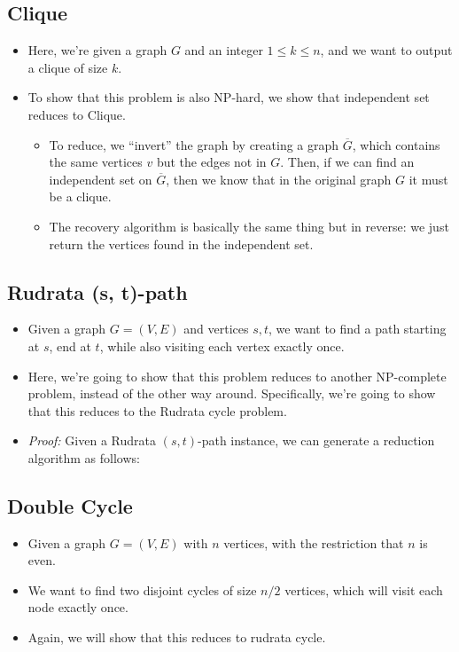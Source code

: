 \subsection{Clique}
\begin{itemize}
	\item Here, we're given a graph \( G \) and an integer \( 1 \le  k \le n \), and we want to output a
		clique of size \( k \). 
	\item To show that this problem is also NP-hard, we show that independent set reduces to Clique. 
		\begin{itemize}
			\item To reduce, we ``invert'' the graph by creating a graph \( \overline G \), which contains 
				the same vertices \( v \) but the edges not in \( G \). Then, if we can 
				find an independent set on \( \overline G \), then we know that in the original graph \( G \) 
				it must be a clique. 
			\item The recovery algorithm is basically the same thing but in reverse: we just return the vertices
				found in the independent set. 
		\end{itemize}
\end{itemize}
\subsection{Rudrata (s, t)-path}
\begin{itemize}
	\item Given a graph \( G = (V, E) \) and vertices \( s, t \), we want to find a path starting at \( s \), 
		end at \( t \), while also visiting each vertex exactly once. 
	\item Here, we're going to show that this problem reduces to another NP-complete problem, instead of the 
		other way around. Specifically, we're going to show that this reduces to the Rudrata cycle problem. 
		
	\item \textit{Proof:} Given a Rudrata \( (s, t) \)-path instance, we can generate a reduction algorithm
		 as follows:
		
\end{itemize}
\subsection{Double Cycle}
\begin{itemize}
	\item Given a graph \( G = (V, E) \) with \( n \) vertices, with the restriction that \( n \) is even.
	\item We want to find two disjoint cycles of size \( n / 2 \) vertices, which will visit each node exactly 
		once. 
	\item Again, we will show that this reduces to rudrata cycle.
\end{itemize}
